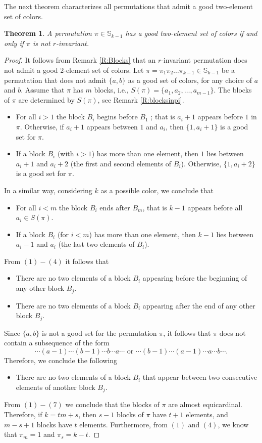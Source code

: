 \documentclass{birkjour}
\newtheorem{thm}{Theorem}[section]
\theoremstyle{definition}
\theoremstyle{remark}
\numberwithin{equation}{section}
\begin{document}
The next theorem characterizes all permutations that admit a good
two-element set of colors.
\begin{thm}\label{T:imadvadobra} A permutation
$\pi\in \mathbb{S}_{k-1}$ has a good two-element set of colors if
and only if $\pi$ is not $r$-invariant.
\end{thm}
\begin{proof}
It follows from Remark \ref{R:Blocks} that an $r$-invariant
permutation does not admit a good $2$-element set of colors. Let
$\pi=\pi_1\pi_2\ldots \pi_{k-1}\in \mathbb{S}_{k-1}$ be a
permutation that does not admit $\{a,b\}$ as a good set of colors,
for any choice of $a$ and $b$. Assume that $\pi$ has $m$ blocks,
i.e., $S(\pi)=\{a_1,a_2,\ldots,a_{m-1}\}$. The blocks of $\pi$ are
determined by $S(\pi)$, see Remark \ref{R:blocksinpi}.
\begin{itemize}
   \item[(1)] For all $i>1$ the block $B_i$ begins before $B_1$
   ; that is $a_{i}+1$ appears before $1$ in $\pi$.
    Otherwise, if $a_{i}+1$ appears between $1$ and $a_i$, then
    $\{1,a_{i}+1\}$ is a good set for $\pi$.
    \item[(2)] If a block $B_i$ (with $i>1$) has more than one element,
     then $1$ lies
    between $a_{i}+1$ and $a_{i}+2$ (the first and second
    elements of $B_i$).
    Otherwise, $\{1,a_{i}+2\}$ is a good set for $\pi$.
\end{itemize}
In a similar way, considering $k$ as a possible color, we conclude
that
 \begin{itemize}
    \item[(3)] For all $i<m$ the block $B_i$ ends after $B_m$,
   that is $k-1$ appears before all $a_i\in
    S(\pi)$.
     \item[(4)] If a block $B_i$ (for $i<m$) has more than one element,
      then $k-1$ lies
    between $a_{i}-1$ and $a_{i}$ (the last two
    elements of $B_i$).
\end{itemize}
From $(1)-(4)$ it follows that
     \begin{itemize}
    \item[(5)] There are no two elements of a block $B_i$ appearing
    before the
    beginning of any other block $B_j$.
    \item[(6)] There are no two elements of a block $B_i$ appearing
    after the end
    of any other block $B_j$.
\end{itemize}
Since $\{a,b\}$ is not a good set for the permutation $\pi$, it
follows that $\pi$ does not contain a subsequence of the form
$$\cdots (a-1)\cdots (b-1)\cdots b \cdots a \cdots \textrm{ or }
\cdots (b-1)\cdots (a-1) \cdots a \cdots b\cdots. $$ Therefore, we
conclude the following
  \begin{itemize}
    \item[(7)] There are no two elements of a block $B_i$ that appear
    between
    two consecutive elements of another block $B_j$.
    \end{itemize}
    From $(1)-(7)$ we conclude that the blocks of $\pi$ are almost
    equicardinal.
    Therefore, if $k=tm+s$, then $s-1$ blocks of $\pi$ have $t+1$
elements, and $m-s+1$ blocks have $t$ elements. Furthermore, from
$(1)$ and $(4)$, we know that $\pi_m=1$ and $\pi_{s}=k-t$.


\end{proof}
\end{document}
